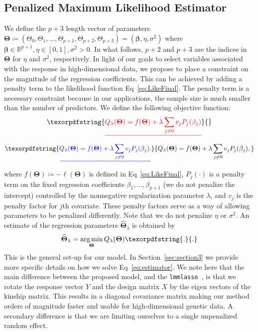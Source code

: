 \documentclass[10pt,letterpaper]{article}
\newcommand{\bTheta}{\boldsymbol{\Theta}}
\newcommand{\bbeta}{\boldsymbol{\beta}}
\DeclareMathOperator*{\argmin}{arg\,min}
\providecommand{\DIFaddtex}[1]{{\protect\color{blue}\uwave{#1}}} %
\providecommand{\DIFdeltex}[1]{{\protect\color{red}\sout{#1}}}                      %
\providecommand{\DIFaddbegin}{} %
\providecommand{\DIFaddend}{} %
\providecommand{\DIFdelbegin}{} %
\providecommand{\DIFdelend}{} %
\providecommand{\DIFadd}[1]{\texorpdfstring{\DIFaddtex{#1}}{#1}} %
\providecommand{\DIFdel}[1]{\texorpdfstring{\DIFdeltex{#1}}{}} %
\newcommand{\DIFscaledelfig}{0.5}
\newlength{\DIFdelgraphicswidth} %
\newlength{\DIFdelgraphicsheight} %
\newcommand{\DIFaddincludegraphics}[2][]{{\color{blue}\fbox{\DIFOincludegraphics[#1]{#2}}}} %
\newcommand{\DIFdelincludegraphics}[2][]{%
\sbox{\DIFdelgraphicsbox}{\DIFOincludegraphics[#1]{#2}}%
\settoboxwidth{\DIFdelgraphicswidth}{\DIFdelgraphicsbox} %
\settoboxtotalheight{\DIFdelgraphicsheight}{\DIFdelgraphicsbox} %
\scalebox{\DIFscaledelfig}{%
\parbox[b]{\DIFdelgraphicswidth}{\usebox{\DIFdelgraphicsbox}\\[-\baselineskip] \rule{\DIFdelgraphicswidth}{0em}}\llap{\resizebox{\DIFdelgraphicswidth}{\DIFdelgraphicsheight}{%
\setlength{\unitlength}{\DIFdelgraphicswidth}%
\begin{picture}(1,1)%
\thicklines\linethickness{2pt} %
{\color[rgb]{1,0,0}\put(0,0){\framebox(1,1){}}}%
{\color[rgb]{1,0,0}\put(0,0){\line( 1,1){1}}}%
{\color[rgb]{1,0,0}\put(0,1){\line(1,-1){1}}}%
\end{picture}%
}\hspace*{3pt}}} %
} %
\DeclareRobustCommand{\DIFaddbegin}{\DIFOaddbegin \let\includegraphics\DIFaddincludegraphics} %
\DeclareRobustCommand{\DIFaddend}{\DIFOaddend \let\includegraphics\DIFOincludegraphics} %
\DeclareRobustCommand{\DIFdelbegin}{\DIFOdelbegin \let\includegraphics\DIFdelincludegraphics} %
\DeclareRobustCommand{\DIFdelend}{\DIFOaddend \let\includegraphics\DIFOincludegraphics} %
\begin{document}
\subsection*{Penalized Maximum Likelihood Estimator}
We define the $p+3$  length vector of parameters $\bTheta \coloneqq \left(\Theta_0, \Theta_1, \ldots, \Theta_{p+1}, \Theta_{p+2}, \Theta_{p+3}\right) =  \left(\bbeta, \eta, \sigma^2 \right)$ where $\bbeta \in \mathbb{R}^{p+1}, \eta \in [0,1], \sigma^2 >0$. In what follows, $p+2$ and $p+3$ are the indices in $\bTheta$ for $\eta$ and $\sigma^2$, respectively. In light of our goals to select variables associated with the response in high-dimensional data, we propose to place a constraint on the magnitude of the regression coefficients. This can be achieved by adding a penalty term to the likelihood function Eq~\ref{eq:LikeFinal}. The penalty term is a necessary constraint because in our applications, the sample size is much smaller than the number of predictors. We define the following objective function:
\DIFdelbegin \begin{displaymath}
\DIFdel{Q_{\lambda}(\bTheta) = f(\bTheta) + \lambda \sum_{j\neq 0} v_j P_j(\beta_j)
}\end{displaymath}%
\DIFdelend \DIFaddbegin \begin{equation*}
\DIFadd{Q_{\lambda}(\bTheta) = f(\bTheta) + \lambda \sum_{j\neq 0} v_j P_j(\beta_j),
}\end{equation*}\DIFaddend 
where $f(\bTheta)\coloneqq-\ell(\bTheta)$ is defined in Eq~\ref{eq:LikeFinal}, $P_j(\cdot)$ is a penalty term on the fixed regression coefficients $\beta_1, \ldots, \beta_{p+1}$ (we do not penalize the intercept) controlled by the nonnegative regularization parameter $\lambda$, and $v_j$ is the penalty factor for $j$th covariate. These penalty factors serve as a way of allowing parameters to be penalized differently. Note that we do not penalize $\eta$ or $\sigma^2$. An estimate of the regression parameters $\widehat{\bTheta}_{\lambda}$ is obtained by
\begin{equation}
\widehat{\bTheta}_{\lambda} = \argmin_{\bTheta} Q_{\lambda}(\bTheta) \label{eq:estimator}\DIFaddbegin \DIFadd{.
}\DIFaddend \end{equation}
This is the general set-up for our model. In Section~\ref{sec:section3} we provide more specific details on how we solve Eq~\ref{eq:estimator}. We note here that the main difference between the proposed model, and the \texttt{lmmlasso}~\cite{schelldorfer2011estimation}, is that we rotate the response vector $Y$ and the design matrix $X$ by the eigen vectors of the kinship matrix. This results in a diagonal covariance matrix making our method orders of magnitude faster and usable for high-dimensional genetic data. A secondary difference is that we are limiting ourselves to a single unpenalized random effect.
\end{document}
